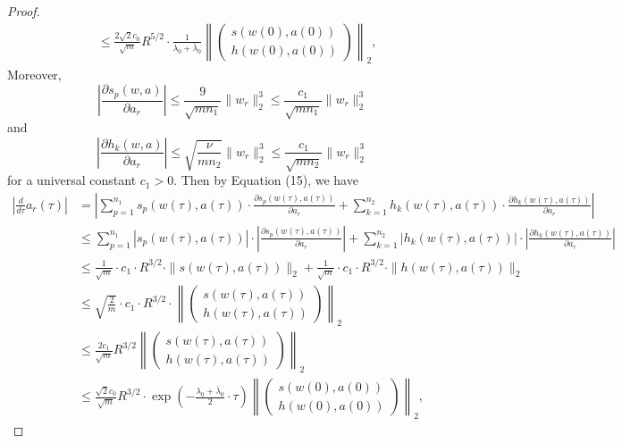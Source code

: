 \documentclass{article}
\begin{document}
\begin{proof}
\begin{align*}
    &\leq \frac{2\sqrt{2} c_0}{\sqrt{m}} R^{5/2} \cdot \frac{1}{\lambda_0 + \bar{\lambda}_0}
    \left\| 
    \begin{pmatrix}
        s(w(0), a(0)) \\
        h(w(0), a(0))
    \end{pmatrix}
    \right\|_2,
\end{align*}
Moreover,
\begin{equation*}
    \left| \frac{\partial s_p(w, a)}{\partial a_r} \right| \leq \frac{9}{\sqrt{mn_1}} \|w_r\|_2^3 \leq \frac{c_1}{\sqrt{mn_1}} \|w_r\|_2^3
\end{equation*}
and
\begin{equation*}
    \left| \frac{\partial h_k(w, a)}{\partial a_r} \right| \leq \sqrt{\frac{\nu}{mn_2}} \|w_r\|_2^3 \leq \frac{c_1}{\sqrt{mn_2}} \|w_r\|_2^3
\end{equation*}
for a universal constant \(c_1 > 0\). Then by Equation (15), we have
\begin{align*}
    \left| \frac{d}{d\tau} a_r(\tau) \right|
    &= \left| \sum_{p=1}^{n_1} s_p(w(\tau), a(\tau)) \cdot \frac{\partial s_p(w(\tau), a(\tau))}{\partial a_r}
    + \sum_{k=1}^{n_2} h_k(w(\tau), a(\tau)) \cdot \frac{\partial h_k(w(\tau), a(\tau))}{\partial a_r} \right| \\
    &\leq \sum_{p=1}^{n_1} |s_p(w(\tau), a(\tau))| \cdot 
    \left| \frac{\partial s_p(w(\tau), a(\tau))}{\partial a_r} \right|
    + \sum_{k=1}^{n_2} |h_k(w(\tau), a(\tau))| \cdot 
    \left| \frac{\partial h_k(w(\tau), a(\tau))}{\partial a_r} \right| \\
    &\leq \frac{1}{\sqrt{m}} \cdot c_1 \cdot R^{3/2} \cdot \| s(w(\tau), a(\tau)) \|_2
    + \frac{1}{\sqrt{m}} \cdot c_1 \cdot R^{3/2} \cdot \| h(w(\tau), a(\tau)) \|_2 \\
    &\leq \sqrt{\frac{2} {m}} \cdot c_1 \cdot R^{3/2} \cdot \left\| 
    \begin{pmatrix}
    s(w(\tau), a(\tau)) \\
    h(w(\tau), a(\tau))
    \end{pmatrix}
    \right\|_2 \\
    &\leq \frac{2c_1}{\sqrt{m}} R^{3/2} 
    \left\| 
    \begin{pmatrix}
    s(w(\tau), a(\tau)) \\
    h(w(\tau), a(\tau))
    \end{pmatrix}
    \right\|_2 \\
    &\leq \frac{\sqrt{2}c_0}{\sqrt{m}} R^{3/2} \cdot \exp \left( -\frac{\lambda_0 + \bar{\lambda}_0}{2} \cdot \tau \right) 
    \left\| 
    \begin{pmatrix}
    s(w(0), a(0)) \\
    h(w(0), a(0))
    \end{pmatrix}
    \right\|_2,
\end{align*}\fi
\end{proof}
\end{document}
